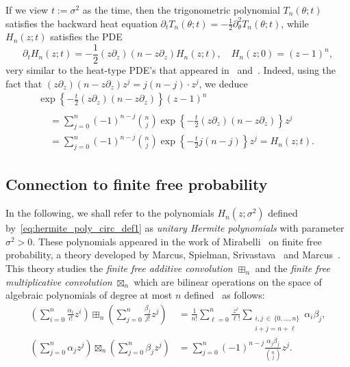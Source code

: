\documentclass[10pt]{amsart}
\theoremstyle{definition}\newtheorem{defi}[theo]{Definition}\newtheorem{rema}[theo]{Remark}\newtheorem{exam}[theo]{Example}\newtheorem{exem}[theo]{Example}\newtheorem{nota}[theo]{Notation}
\begin{document}
If we view $t := \sigma^2$ as the time, then the trigonometric polynomial $T_n(\theta; t)$ satisfies the backward heat equation $\partial_t T_n(\theta; t) = -\frac 12 \partial_\theta^2 T_n(\theta; t)$, while $H_n(z;t)$ satisfies the PDE
\[
\partial_t H_n(z; t) = - \frac 12 (z \partial_z) (n- z\partial_z) H_n(z;t),
\quad H_n(z; 0) = (z-1)^n,
\]
very similar to the heat-type PDE's that appeared in~\cite{tao_blog2} and~\cite[Section~2.3]{hall_ho}. Indeed, using the fact that $(z \partial_z) (n- z\partial_z) z^j = j(n-j) \cdot z^j$, we deduce
\begin{multline*}
\exp\left\{-\frac t2 (z \partial_z) (n- z\partial_z)\right\} (z-1)^n \\
\begin{aligned}
&=
\sum_{j=0}^n (-1)^{n-j} \binom nj \exp\left\{-\frac t2 (z \partial_z) (n- z\partial_z)\right\} z^j\\
&=
\sum_{j=0}^n (-1)^{n-j} \binom nj \exp\left\{ - \frac {t}{2} j (n-j)\right\} z^j = H_n(z;t).
\end{aligned}
\end{multline*}



\subsection{Connection to finite free probability} In the following, we shall refer to the polynomials $H_n(z; \sigma^2)$ defined by~\eqref{eq:hermite_poly_circ_def1} as \emph{unitary Hermite polynomials} with parameter $\sigma^2>0$. These polynomials appeared in the work of Mirabelli~\cite{mirabelli_diss} on finite free probability, a theory developed by Marcus, Spielman, Srivastava~\cite{marcus_spielman_srivastava} and Marcus~\cite{marcus}. This theory studies the \emph{finite free additive convolution} $\boxplus_{n}$ and the \emph{finite free multiplicative convolution} $\boxtimes_{n}$ which are bilinear operations on the space of algebraic polynomials of degree at most $n$ defined~\cite{marcus,marcus_spielman_srivastava} as follows:
\begin{align}
\left(\sum_{i=0}^{n} \frac{\alpha_i}{i!} z^i \right)\boxplus_{n}\left(\sum_{j=0}^{n} \frac{\beta_j}{j!} z^j \right) &=
\frac 1 {n!} \sum_{\ell=0}^{n} \frac{z^\ell}{\ell!} \sum_{\substack{i,j\,\in\,\{0,\ldots, n\}\\ i+j=n+\ell}} \alpha_i \beta_j, \label{eq:finite_free_add_conv_def}
\\
\left(\sum_{j=0}^{n} \alpha_j z^j \right)\boxtimes_{n}\left(\sum_{j=0}^{n} \beta_j z^j \right) &=
\sum_{j=0}^{n} (-1)^{n-j} \frac{\alpha_j \beta_j}{\binom {n}{j}} z^j. \label{eq:finite_free_mult_conv_def}
\end{align}
\end{document}
